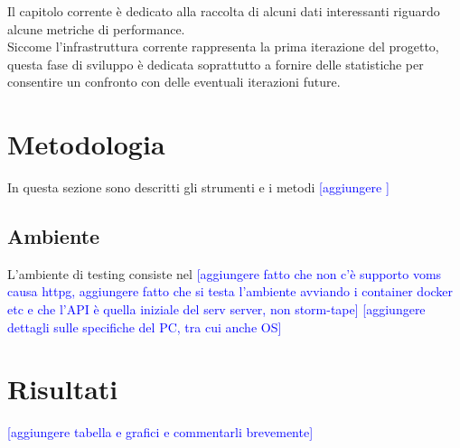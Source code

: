 
Il capitolo corrente è dedicato alla raccolta di alcuni dati interessanti riguardo alcune metriche di performance. 
\\ Siccome l'infrastruttura corrente rappresenta la prima iterazione del progetto,
 questa fase di sviluppo è dedicata soprattutto a fornire delle statistiche per consentire un confronto con delle eventuali iterazioni future. 
 
 \section{Metodologia}
 In questa sezione sono descritti gli strumenti e i metodi 
 \textcolor{blue}{[aggiungere ]}

 \subsection{Ambiente}
 L'ambiente di testing consiste nel \textcolor{blue}{[aggiungere fatto che non c'è supporto voms causa httpg,
  aggiungere fatto che si testa l'ambiente avviando i container docker etc e che l'API è quella iniziale del serv server, non storm-tape]}
  \textcolor{blue}{[aggiungere dettagli sulle specifiche del PC, tra cui anche OS]}

 \section{Risultati}
 \textcolor{blue}{[aggiungere tabella e grafici e commentarli brevemente]}